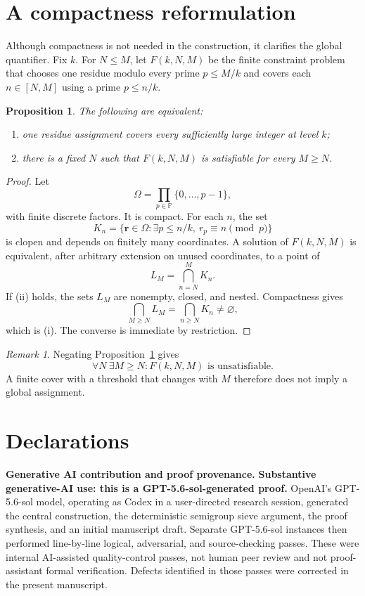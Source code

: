 \documentclass[10pt]{amsart}
\numberwithin{equation}{section}
\newcommand{\PP}{\mathbb P}
\newtheorem{proposition}[theorem]{Proposition}
\theoremstyle{remark}
\newtheorem{remark}[theorem]{Remark}
\begin{document}
\section{A compactness reformulation}

Although compactness is not needed in the construction, it clarifies the
global quantifier. Fix \(k\). For \(N\le M\), let \(F(k,N,M)\) be the finite
constraint problem that chooses one residue modulo every prime \(p\le M/k\)
and covers each \(n\in[N,M]\) using a prime \(p\le n/k\).

\begin{proposition}\label{prop:compactness}
The following are equivalent:
\begin{enumerate}[label=\textup{(\roman*)}]
\item one residue assignment covers every sufficiently large integer at
level \(k\);
\item there is a fixed \(N\) such that \(F(k,N,M)\) is satisfiable for every
\(M\ge N\).
\end{enumerate}
\end{proposition}

\begin{proof}
Let
\[
 \Omega=\prod_{p\in\PP}\{0,\ldots,p-1\},
\]
with finite discrete factors. It is compact. For each \(n\), the set
\[
 K_n=
 \{\boldsymbol r\in\Omega:
 \exists p\le n/k,\ r_p\equiv n\pmod p\}
\]
is clopen and depends on finitely many coordinates. A solution of
\(F(k,N,M)\) is equivalent, after arbitrary extension on unused coordinates,
to a point of
\[
 L_M=\bigcap_{n=N}^M K_n.
\]
If (ii) holds, the sets \(L_M\) are nonempty, closed, and nested.
Compactness gives
\[
 \bigcap_{M\ge N}L_M=\bigcap_{n\ge N}K_n\ne\varnothing,
\]
which is (i). The converse is immediate by restriction.
\end{proof}

\begin{remark}
Negating Proposition~\ref{prop:compactness} gives
\[
 \forall N\ \exists M\ge N:
 F(k,N,M)\text{ is unsatisfiable}.
\]
A finite cover with a threshold that changes with \(M\) therefore does not
imply a global assignment.
\end{remark}

\section*{Declarations}

\noindent\textbf{Generative AI contribution and proof provenance.}
\textbf{Substantive generative-AI use: this is a GPT-5.6-sol-generated
proof.} OpenAI's GPT-5.6-sol model, operating as Codex in a user-directed
research session, generated the central construction, the deterministic
semigroup sieve argument, the proof synthesis, and an initial manuscript
draft. Separate GPT-5.6-sol instances then performed line-by-line logical,
adversarial, and source-checking passes. These were internal AI-assisted
quality-control passes, not human peer review and not proof-assistant formal
verification. Defects identified in those passes were corrected in the
present manuscript.
\end{document}
